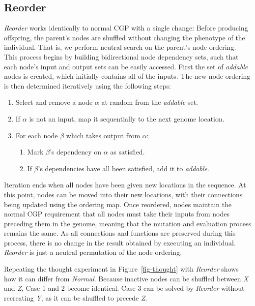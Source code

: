 \documentclass{sig-alternate}
\begin{document}
\subsection{Reorder}
\label{sec-reorder}
\emph{Reorder} works identically to normal CGP with a single change:
Before producing offspring, the parent's nodes are shuffled without changing the phenotype of the individual.
That is, we perform neutral search on the parent's node ordering.
This process begins by building bidirectional node dependency sets, such that
each node's input and output sets can be easily accessed.  First the
set of \emph{addable} nodes is created, which initially contains all of the
inputs.  The new node ordering is then determined iteratively using the following
steps:
\begin{enumerate}
  \item Select and remove a node $\alpha$ at random from the \emph{addable} set.
  \item If $\alpha$ is not an input, map it sequentially to the next genome location.
  \item For each node $\beta$ which takes output from $\alpha$:
  \begin{enumerate}
    \item Mark $\beta$'s dependency on $\alpha$ as satisfied.
    \item If $\beta$'s dependencies have all been satisfied, add it to \emph{addable}.
  \end{enumerate}
\end{enumerate}
Iteration ends
when all nodes have been given new locations in the sequence.  At this point, nodes can be moved
into their new locations, with their connections being updated using the ordering
map.  Once reordered, nodes maintain the normal CGP requirement that all nodes
must take their inputs from nodes preceding them in the genome, meaning that
the mutation and evaluation process remains the same.  As all connections and functions are
preserved during this process, there is no change in the result obtained by executing
an individual.  \emph{Reorder} is just a neutral permutation of the node ordering.

Repeating the thought experiment in Figure~\ref{fig-thought} with
\emph{Reorder} shows how it can differ from \emph{Normal}.  Because inactive nodes
can be shuffled between \emph{X} and \emph{Z}, Case 1 and 2 become identical.
Case 3 can be
solved by \emph{Reorder} without recreating \emph{Y}, as it can
be shuffled to precede \emph{Z}.
\end{document}

